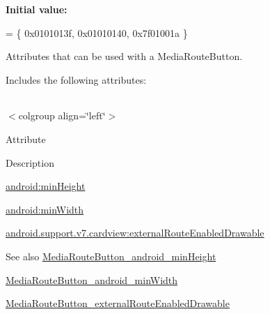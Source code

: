 {\bfseries Initial value\+:}
\begin{DoxyCode}
= \{
            0x0101013f, 0x01010140, 0x7f01001a
        \}
\end{DoxyCode}
Attributes that can be used with a Media\+Route\+Button. 

Includes the following attributes\+:

\tabulinesep=1mm
\begin{longtabu} spread 0pt [c]{*{0}{|X[-1]}|}
\hline
\end{longtabu}
$<$colgroup align=\char`\"{}left\char`\"{}$>$ 

Attribute

Description 

{\ttfamily \hyperlink{classandroid_1_1support_1_1v7_1_1cardview_1_1R_1_1styleable_a9c1814d26c4c44bbbf65dfb6f0a8c576}{android\+:min\+Height}}

{\ttfamily \hyperlink{classandroid_1_1support_1_1v7_1_1cardview_1_1R_1_1styleable_a0d6a2bbf7eac89cdb181bdee1f0054cd}{android\+:min\+Width}}

{\ttfamily \hyperlink{classandroid_1_1support_1_1v7_1_1cardview_1_1R_1_1styleable_ae978630e03770b486c54d3274c7ca28c}{android.\+support.\+v7.\+cardview\+:external\+Route\+Enabled\+Drawable}}

\begin{DoxySeeAlso}{See also}
\hyperlink{classandroid_1_1support_1_1v7_1_1cardview_1_1R_1_1styleable_a9c1814d26c4c44bbbf65dfb6f0a8c576}{Media\+Route\+Button\+\_\+android\+\_\+min\+Height} 

\hyperlink{classandroid_1_1support_1_1v7_1_1cardview_1_1R_1_1styleable_a0d6a2bbf7eac89cdb181bdee1f0054cd}{Media\+Route\+Button\+\_\+android\+\_\+min\+Width} 

\hyperlink{classandroid_1_1support_1_1v7_1_1cardview_1_1R_1_1styleable_ae978630e03770b486c54d3274c7ca28c}{Media\+Route\+Button\+\_\+external\+Route\+Enabled\+Drawable} 
\end{DoxySeeAlso}
\mbox{\label{classandroid_1_1support_1_1v7_1_1cardview_1_1R_1_1styleable_a9c1814d26c4c44bbbf65dfb6f0a8c576}} 
